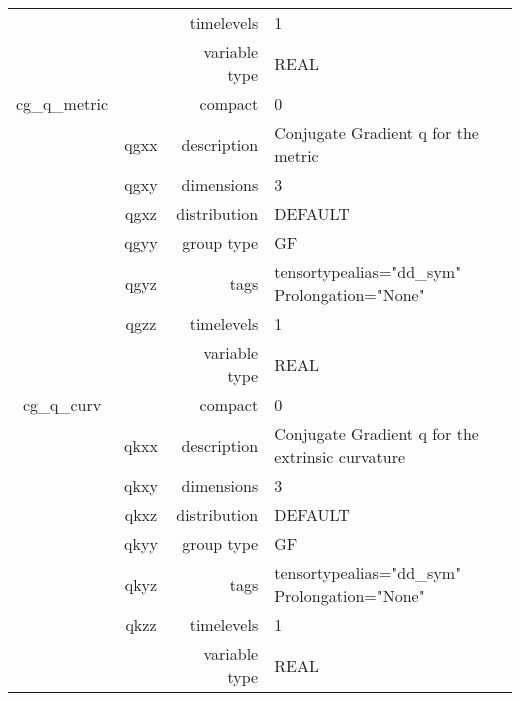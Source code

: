 \begin{tabular*}{150mm}{|c|c@{\extracolsep{\fill}}|rl|}
 &  & timelevels & 1 \\ 
 &  & variable type & REAL \\ 
\hline 
cg\_q\_metric &  & compact & 0 \\ 
 & qgxx & description & Conjugate Gradient q for the metric \\ 
 & qgxy & dimensions & 3 \\ 
 & qgxz & distribution & DEFAULT \\ 
 & qgyy & group type & GF \\ 
 & qgyz & tags & tensortypealias="dd\_sym" Prolongation="None" \\ 
 & qgzz & timelevels & 1 \\ 
 &  & variable type & REAL \\ 
\hline 
cg\_q\_curv &  & compact & 0 \\ 
 & qkxx & description & Conjugate Gradient q for the extrinsic curvature \\ 
 & qkxy & dimensions & 3 \\ 
 & qkxz & distribution & DEFAULT \\ 
 & qkyy & group type & GF \\ 
 & qkyz & tags & tensortypealias="dd\_sym" Prolongation="None" \\ 
 & qkzz & timelevels & 1 \\ 
 &  & variable type & REAL \\ 
\hline 
\end{tabular*} 



\vspace{5mm}
\vspace{5mm}

